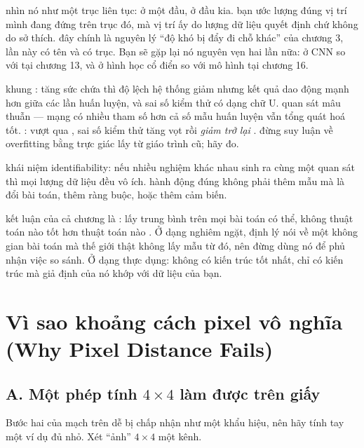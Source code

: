\documentclass[../../deep_learning.tex]{subfiles}
\begin{document}
\begin{mach}
\item {} \gp nhìn nó như một trục liên tục:  ở một đầu,  ở đầu kia. \gd bạn ước lượng đúng vị trí mình đang đứng trên trục đó, mà vị trí ấy do lượng dữ liệu quyết định chứ không do sở thích. \hq đây chính là nguyên lý ``độ khó bị đẩy đi chỗ khác'' của chương 3, lần này có tên và có trục. Bạn sẽ gặp lại nó nguyên vẹn hai lần nữa: ở CNN so với  tại chương 13, và ở hình học cổ điển so với mô hình  tại chương 16. 
\item {} \gd khung : tăng sức chứa thì độ lệch hệ thống giảm nhưng kết quả dao động mạnh hơn giữa các lần huấn luyện, và sai số kiểm thử có dạng chữ U. \vdm quan sát mâu thuẫn --- mạng có nhiều tham số hơn cả số mẫu huấn luyện vẫn tổng quát hoá tốt. \gp {}: vượt qua , sai số kiểm thử tăng vọt rồi \emph{giảm trở lại} \cite{belkin2019double,nakkiran2020deep}. \hq đừng suy luận về overfitting bằng trực giác lấy từ giáo trình cũ; hãy đo.
\item {} \gp khái niệm identifiability: nếu nhiều nghiệm khác nhau sinh ra cùng một quan sát thì mọi lượng dữ liệu đều vô ích. \hq hành động đúng không phải thêm mẫu mà là đổi bài toán, thêm ràng buộc, hoặc thêm cảm biến.
\item {} \hq kết luận của cả chương là : lấy trung bình trên mọi bài toán có thể, không thuật toán nào tốt hơn thuật toán nào \cite{wolpert1997nfl}. Ở dạng nghiêm ngặt, định lý nói về một không gian bài toán mà thế giới thật không lấy mẫu từ đó, nên đừng dùng nó để phủ nhận việc so sánh. Ở dạng thực dụng: không có kiến trúc tốt nhất, chỉ có kiến trúc mà giả định của nó khớp với dữ liệu của bạn.
\end{mach}

\section{Vì sao khoảng cách pixel vô nghĩa (Why Pixel Distance Fails)}

\subsection{A. Một phép tính \(4\times4\) làm được trên giấy}
Bước hai của mạch trên dễ bị chấp nhận như một khẩu hiệu, nên hãy tính tay một ví dụ đủ nhỏ. Xét ``ảnh'' \(4\times4\) một kênh.
\end{document}
